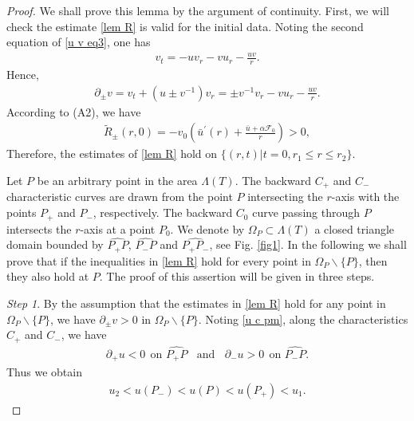\documentclass[10pt,a4paper]{amsart}
\begin{document}
\begin{proof}
	We shall prove this lemma by the argument of continuity. First, we will check the estimate \eqref{lem R} is valid for the initial data. Noting the second equation of \eqref{u v eq3}, one has
	\begin{equation*} 
		\begin{aligned}
			v_{t} = -uv_{r} - vu_r-\frac{uv}{r}.
		\end{aligned}
	\end{equation*}	
	Hence,
	\begin{equation*} 
		\begin{aligned}
			\partial_{\pm} v  = v_{t} + (u \pm v^{-1}) v_{r}  = \pm v^{-1} v_{r} - vu_r-\frac{uv}{r}.
		\end{aligned}
	\end{equation*}	
	According to (A2), we have
	\begin{equation*} 
		\begin{aligned}
			\tilde{R}_{\pm}(r,0) =  -v_0 \left(   \bar{u}^{\prime}(r) + \frac{\bar{u} + \alpha \mathcal{F}_{0}}{r} \right) >0 ,
		\end{aligned}
	\end{equation*}	
	Therefore, the estimates of \eqref{lem R} hold on $\{(r,t)|t=0, r_1 \leq r \leq r_2 \}$.
	
	
	Let $P$ be an arbitrary point in the area $\Lambda (T)$. The backward $C_{+}$ and $C_{-}$ characteristic curves are drawn from the point $P$ intersecting the $r$-axis with the points $P_{+}$ and $P_{-}$, respectively. The backward $C_{0}$ curve passing through $P$ intersects the $r$-axis at a point $P_{0}$. We denote by $\Omega_{P}\subset \Lambda (T)$ a closed triangle domain
	bounded by $\widehat{P_{+} P}$, $\widehat{P_{-} P}$	and $\widehat{P_{+} P_{-}}$, see Fig. \ref{fig1}. In the following we shall prove that if the inequalities in \eqref{lem R} hold
	for every point in $\Omega_{P} \backslash \{P\}$, then they also hold at $P$. The proof of this assertion will be given in three steps.
	
	{\textit{Step 1}}.	By the assumption that the estimates in \eqref{lem R} hold for any point in $\Omega_{P} \backslash \{P\}$, we have $\partial_{\pm}v> 0$ in $\Omega_{P} \backslash \{P\}$. Noting \eqref{u c pm}, along the characteristics $C_{+}$ and $C_{-}$, we have
	\begin{equation*} 
		\begin{aligned}
			\partial_{+} u  < 0 \ \ \text{on } \widehat{P_{+} P} \ \ \ \ \text{and} \ \ \ \	\partial_{-} u   > 0 \ \ \text{on } \widehat{P_{-} P}.
		\end{aligned}
	\end{equation*}	
	Thus we obtain 
	\begin{equation*} 
		\begin{aligned}
			u_2 < u(P_{-}) < u(P) < u(P_{+}) < u_1.
		\end{aligned}
	\end{equation*}	
	

\end{proof}
\end{document}
